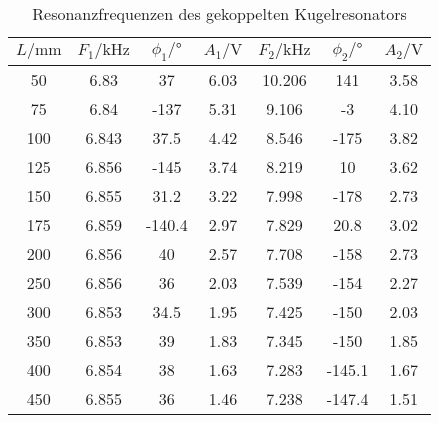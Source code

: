\begin{table}
    \centering
    \caption{Resonanzfrequenzen des gekoppelten Kugelresonators}
    \label{tab:zylinder}
    \begin{tabular}{c c c c c c c}
        \toprule
        $L/\si{\milli\meter}$ & $F_1/\si{\kilo\hertz}$ & $\phi_1/°$ & $A_1/\si{\volt}$ & $F_2/\si{\kilo\hertz}$ & $\phi_2/°$ & $A_2/\si{\volt}$\\
        \midrule
        50  &6.83    &37      &6.03    &10.206  &141     &3.58\\
        75  &6.84    &-137    &5.31    &9.106   &-3      &4.10\\
        100 &6.843   &37.5    &4.42    &8.546   &-175    &3.82\\
        125 &6.856   &-145    &3.74    &8.219   &10      &3.62\\
        150 &6.855   &31.2    &3.22    &7.998   &-178    &2.73\\
        175 &6.859   &-140.4  &2.97    &7.829   &20.8    &3.02\\
        200 &6.856   &40      &2.57    &7.708   &-158    &2.73\\
        250 &6.856   &36      &2.03    &7.539   &-154    &2.27\\
        300 &6.853   &34.5    &1.95    &7.425   &-150    &2.03\\
        350 &6.853   &39      &1.83    &7.345   &-150    &1.85\\
        400 &6.854   &38      &1.63    &7.283   &-145.1  &1.67\\
        450 &6.855   &36      &1.46    &7.238   &-147.4  &1.51\\
        \bottomrule
    \end{tabular}
\end{table}